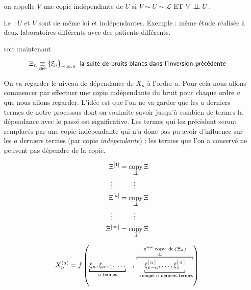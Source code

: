 \begin{definition}
	on appelle $V$ une copie indépendante de $U$ si $V \sim U \sim \mathcal L$ ET $V \perp \!\!\! \perp U$.

	i.e : $U$ et $V$ sont de même loi et indépendantes. Exemple : même étude réalisée à deux laboratoires différents avec des patients différents.
\end{definition}

soit maintenant

$$\Xi_n \underset {\textsf{déf}} {\equiv} \left\{ \xi_n\right\}_{-\infty : n} \textsf{ la suite de bruits blancs dans l'inversion précédente}$$

On va regarder le niveau de dépendance de $X_n$ à l'ordre $a$. Pour cela nous allons commencer par effectuer une copie indépendante du bruit pour chaque ordre $a$ que nous allons regarder. L'idée est que l'on ne va garder que les $a$ derniers termes de notre processus dont on souhaite savoir jusqu'à combien de termes la dépendance avec le passé est significative. Les termes qui les précèdent seront remplacés par une copie indépendante qui n'a donc pas pu avoir d'influence sur les $a$ derniers termes (par copie \emph{indépendante}) : les termes que l'on a conservé ne peuvent pas dépendre de la copie.


\begin{minipage}{0.45\textwidth}

	\begin{align*}
		\Xi^{[1]}      & = \operatornamewithlimits{copy}\limits_{\indep} \Xi
		\\
		\vdots\quad    & \quad\quad \vdots
		\\
		\Xi^{[a]}      & = \operatornamewithlimits{copy}\limits_{\indep} \Xi
		\\ \vdots\quad &  \quad\quad \vdots
		\\
		\Xi^{[\infty]} & = \operatornamewithlimits{copy}\limits_{\indep} \Xi
	\end{align*}

\end{minipage}
%
\begin{minipage}{0.45\textwidth}
	$$X_n^{(a)} = f\left(
		\underbracket[0.187ex]{
			\xi_n, \xi_{n-1}, \; \dots}_
		{a \textsf{ termes}}
		\quad , \,
		\overbracket[0.187ex]
		{\underbracket[0.187ex]{\xi_{n-a}^{[\, a \, ]} , \dots , \xi_{1}^{[ \, a \, ]}}_
			{\textsf{ tronqué } a \textsf{ derniers termes}}
		}^{a^{\textsf{ème}} \, \operatornamewithlimits{copy}\limits_{\indep} \textsf{ de } (\Xi_n)}
		\right)$$
\end{minipage}

